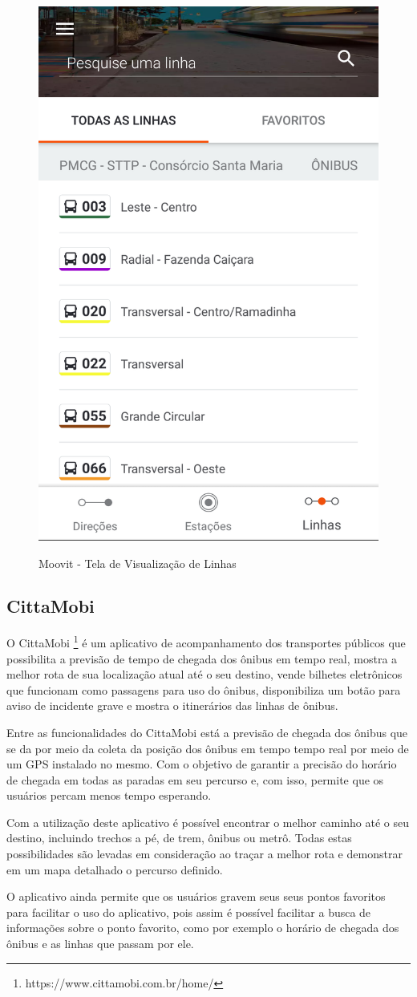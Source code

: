 \begin{figure}[H]
\caption{Moovit - Tela de Visualização de Linhas}
\centering
\includegraphics[width=.4\textwidth]{imagens/moovit.png}
\label{fig:moovit}
\end{figure}

\subsection{CittaMobi}

O CittaMobi \footnote{https://www.cittamobi.com.br/home/} é um aplicativo de acompanhamento dos transportes públicos que possibilita a previsão de tempo de chegada dos ônibus em tempo real, mostra a melhor rota de sua localização atual até o seu destino, vende bilhetes eletrônicos que funcionam como passagens para uso do ônibus, disponibiliza um botão para aviso de incidente grave e mostra o itinerários das linhas de ônibus.

Entre as funcionalidades do CittaMobi está a previsão de chegada dos ônibus que se da por meio da coleta da posição dos ônibus em tempo tempo real por meio de um GPS instalado no mesmo. Com o objetivo de garantir a precisão do horário de chegada em todas as paradas em seu percurso e, com isso, permite que os usuários percam menos tempo esperando. 

Com a utilização deste aplicativo é possível encontrar o melhor caminho até o seu destino, incluindo trechos a pé, de trem, ônibus ou metrô. Todas estas possibilidades são levadas em consideração ao traçar a melhor rota e demonstrar em um mapa detalhado o percurso definido.

O aplicativo ainda permite que os usuários gravem seus seus pontos favoritos para facilitar o uso do aplicativo, pois assim é possível facilitar a busca de informações sobre o ponto favorito, como por exemplo o horário de chegada dos ônibus e as linhas que passam por ele.

